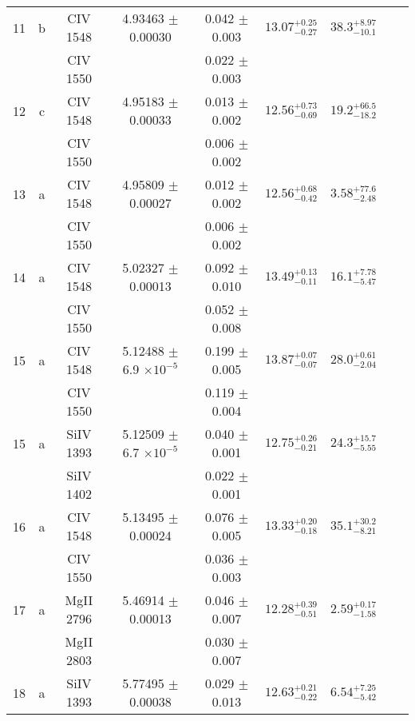 \documentclass[12pt]{article}
\begin{document}
\begin{footnotesize}
\begin{longtable}{ c c c c c c c c c}
      11  & b  & CIV     1548  &  4.93463 $\pm$ 0.00030  &  0.042 $\pm$ 0.003   & $13.07_{ - 0.27}^{ + 0.25}$  & $38.3_{ - 10.1}^{ + 8.97}$    & 	 & \\ 
  &   & CIV     1550  &  &  0.022 $\pm$ 0.003   &   &     & 	 & \\ 
      12  & c  & CIV     1548  &  4.95183 $\pm$ 0.00033  &  0.013 $\pm$ 0.002   & $12.56_{ - 0.69}^{ + 0.73}$  & $19.2_{ - 18.2}^{ + 66.5}$    & 	 & \\ 
  &   & CIV     1550  &  &  0.006 $\pm$ 0.002   &   &     & 	 & \\ 
      13  & a  & CIV     1548  &  4.95809 $\pm$ 0.00027  &  0.012 $\pm$ 0.002   & $12.56_{ - 0.42}^{ + 0.68}$  & $3.58_{ - 2.48}^{ + 77.6}$    & 	 & \\ 
  &   & CIV     1550  &  &  0.006 $\pm$ 0.002   &   &     & 	 & \\ 
      14  & a  & CIV     1548  &  5.02327 $\pm$ 0.00013  &  0.092 $\pm$ 0.010   & $13.49_{ - 0.11}^{ + 0.13}$  & $16.1_{ - 5.47}^{ + 7.78}$    & 	 & \\ 
  &   & CIV     1550  &  &  0.052 $\pm$ 0.008   &   &     & 	 & \\ 
      15  & a  & CIV     1548  &  5.12488 $\pm$ 6.9 $\times 10^{-5}$   &  0.199 $\pm$ 0.005   & $13.87_{ - 0.07}^{ + 0.07}$  & $28.0_{ - 2.04}^{ + 0.61}$    & 	 & \\ 
  &   & CIV     1550  &  &  0.119 $\pm$ 0.004   &   &     & 	 & \\ 
      15  & a  & SiIV     1393  &  5.12509 $\pm$ 6.7 $\times 10^{-5}$   &  0.040 $\pm$ 0.001   & $12.75_{ - 0.21}^{ + 0.26}$  & $24.3_{ - 5.55}^{ + 15.7}$    & 	 & \\ 
  &   & SiIV     1402  &  &  0.022 $\pm$ 0.001   &   &     & 	 & \\ 
      16  & a  & CIV     1548  &  5.13495 $\pm$ 0.00024  &  0.076 $\pm$ 0.005   & $13.33_{ - 0.18}^{ + 0.20}$  & $35.1_{ - 8.21}^{ + 30.2}$    & 	 & \\ 
  &   & CIV     1550  &  &  0.036 $\pm$ 0.003   &   &     & 	 & \\ 
      17  & a  & MgII     2796  &  5.46914 $\pm$ 0.00013  &  0.046 $\pm$ 0.007   & $12.28_{ - 0.51}^{ + 0.39}$  & $2.59_{ - 1.58}^{ + 0.17}$    & 	 & \\ 
  &   & MgII     2803  &  &  0.030 $\pm$ 0.007   &   &     & 	 & \\ 
      18  & a  & SiIV     1393  &  5.77495 $\pm$ 0.00038  &  0.029 $\pm$ 0.013   & $12.63_{ - 0.22}^{ + 0.21}$  & $6.54_{ - 5.42}^{ + 7.25}$    & 	 & \\ 

\end{longtable}
\end{footnotesize}
\end{document}
